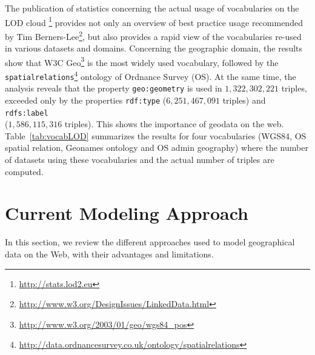 The publication \cite{demter-2012-ekaw} of statistics concerning the actual usage of vocabularies on the LOD cloud \footnote{\url{http://stats.lod2.eu}} provides not only an overview of best practice usage recommended by Tim Berners-Lee\footnote{\url{http://www.w3.org/DesignIssues/LinkedData.html}}, but also provides a rapid view of the vocabularies re-used in various datasets and domains. Concerning the geographic domain, the results show that W3C Geo\footnote{\url{http://www.w3.org/2003/01/geo/wgs84_pos}} is the most widely used vocabulary, followed by the \texttt{spatialrelations}\footnote{\url{http://data.ordnancesurvey.co.uk/ontology/spatialrelations}} ontology of Ordnance Survey (OS). At the same time, the analysis reveals that the property \texttt{geo:geometry} is used in $1,322,302,221$ triples, exceeded only by the properties \texttt{rdf:type} ($6,251,467,091$ triples) and \texttt{rdfs:label}\\($1,586,115,316$ triples). This shows the importance of geodata on the web. Table~\ref{tab:vocabLOD} summarizes the results for four vocabularies (WGS84, OS spatial relation, Geonames ontology and OS admin geography) where the number of datasets using these vocabularies and the actual number of triples are computed.
 \\
\begin{table}[!htbp]
\end{table}

\section{Current Modeling Approach}
\label{sec:currentmodel}
In this section, we review the different approaches used to model geographical data on the Web, with their advantages and limitations.

